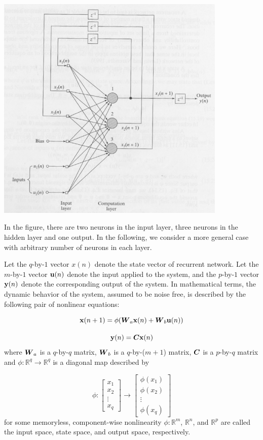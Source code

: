 \begin{enumerate}
  \hspace{2cm}\includegraphics[width=11cm]{l12k9}

  \begin{solution}

    In the figure, there are two neurons in the input layer, three neurons in the hidden layer and one
    output. In the following, we consider a more general case with arbitrary number of neurons in each layer.

    Let the $q$-by-$1$ vector $x(n)$ denote the state vector of recurrent network. Let the $m$-by-$1$ vector ${\bf{u}}(n)$ 
    denote the input
    applied to the system, and the $p$-by-$1$ vector ${\bf{y}}(n)$ denote the
    corresponding output of the system. In mathematical terms, the dynamic
    behavior of the system, assumed to be noise free, is described by the
    following pair of nonlinear equations:

    \[
    {\bf{x}}(n+1) = \phi (\boldsymbol{W}_a {\bf{x}}(n) + \boldsymbol{W}_b {\bf{u}}(n))
    \]

    \[
    {\bf{y}}(n) = \boldsymbol{C} {\bf{x}}(n)
    \]
    where $\boldsymbol{W}_a$ is a $q$-by-$q$ matrix, $\boldsymbol{W}_b$ is a $q$-by-($m+1$) matrix, $\boldsymbol{C}$ is a
    $p$-by-$q$ matrix and $\phi: \mathbb{R}^q \rightarrow \mathbb{R}^q$ is a
    diagonal map described by

    \[
    \phi:
    \left[\begin{array}{c}
        x_1 \\
        x_2 \\
        \vdots \\
        x_q
      \end{array}\right]
    \rightarrow
    \left[\begin{array}{c}
        \phi(x_1) \\
        \phi(x_2) \\
        \vdots \\
        \phi(x_q)
      \end{array}\right]
    \]
    for some memoryless, component-wise nonlinearity $\phi: \mathbb{R}^m$,
    $\mathbb{R}^n$, and $\mathbb{R}^p$ are called the input space, state
    space, and output space, respectively.


\end{solution}
\end{enumerate}
